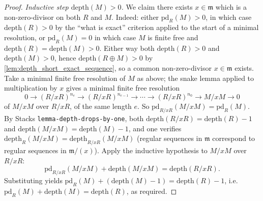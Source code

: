 \begin{proof}
  \emph{Inductive step \(\text{depth}(M) > 0\).} We claim there exists \(x \in \mathfrak{m}\)
  which is a non-zero-divisor on both \(R\) and \(M\). Indeed: either \(\text{pd}_R(M) > 0\), in
  which case \(\text{depth}(R) > 0\) by the ``what is exact'' criterion applied to the start
  of a minimal resolution, or \(\text{pd}_R(M) = 0\) in which case \(M\) is finite free and
  \(\text{depth}(R) = \text{depth}(M) > 0\). Either way both \(\text{depth}(R) > 0\) and
  \(\text{depth}(M) > 0\), hence \(\text{depth}(R \oplus M) > 0\) by
  \cref{lem:depth_short_exact_sequence}, so a common non-zero-divisor \(x \in
  \mathfrak{m}\) exists. Take a minimal finite free resolution of \(M\) as above; the snake
  lemma applied to multiplication by \(x\) gives a minimal finite free resolution
  \[
    0 \to (R/xR)^{n_e} \to (R/xR)^{n_{e-1}} \to \cdots \to (R/xR)^{n_0} \to M/xM \to 0
  \]
  of \(M/xM\) over \(R/xR\), of the same length \(e\). So
  \(\text{pd}_{R/xR}(M/xM) = \text{pd}_R(M)\). By Stacks
  \texttt{lemma-depth-drops-by-one}, both \(\text{depth}(R/xR) = \text{depth}(R) - 1\) and
  \(\text{depth}(M/xM) = \text{depth}(M) - 1\), and one verifies
  \(\text{depth}_R(M/xM) = \text{depth}_{R/xR}(M/xM)\) (regular sequences in \(\mathfrak{m}\)
  correspond to regular sequences in \(\mathfrak{m}/(x)\)). Apply the inductive hypothesis to
  \(M/xM\) over \(R/xR\):
  \[
    \text{pd}_{R/xR}(M/xM) + \text{depth}(M/xM) = \text{depth}(R/xR).
  \]
  Substituting yields
  \(\text{pd}_R(M) + (\text{depth}(M) - 1) = \text{depth}(R) - 1\), i.e.\
  \(\text{pd}_R(M) + \text{depth}(M) = \text{depth}(R)\), as required.
\end{proof}

